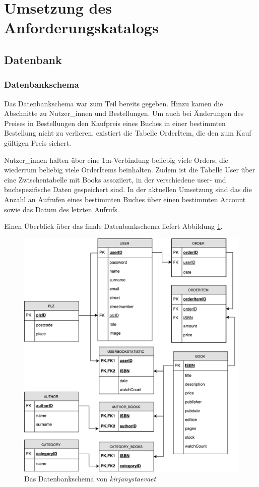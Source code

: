 \section{Umsetzung des Anforderungskatalogs}\label{sec:umsetzung}
	\subsection{Datenbank}\label{sec:umsetzung:DB:DBS}
		\subsubsection{Datenbankschema}\label{sec:umsetzung:DB:Schema}
		Das Datenbankschema war zum Teil bereits gegeben. Hinzu kamen die Abschnitte zu Nutzer\_innen und Bestellungen. Um auch bei Änderungen des Preises in Bestellungen den Kaufpreis eines Buches in einer bestimmten Bestellung nicht zu verlieren, existiert die Tabelle OrderItem, die den zum Kauf gültigen Preis sichert.
		
		Nutzer\_innen halten über eine 1:n-Verbindung beliebig viele Orders, die wiederrum beliebig viele OrderItems beinhalten. Zudem ist die Tabelle User über eine Zwischentabelle mit Books assoziiert, in der verschiedene user- und buchspezifische Daten gespeichert sind. In der aktuellen Umsetzung sind das die Anzahl an Aufrufen eines bestimmten Buches über einen bestimmten Account sowie das Datum des letzten Aufrufs.
		
		Einen Überblick über das finale Datenbankschema liefert Abbildung \ref{fig:db-schema}.
	
       \begin{figure}[h]
		 \centering
		\includegraphics[width=\linewidth]{files/db-schema}
		\caption{Das Datenbankschema von \textit{kirjanystaevaet}}
		\label{fig:db-schema}
		\end{figure}

